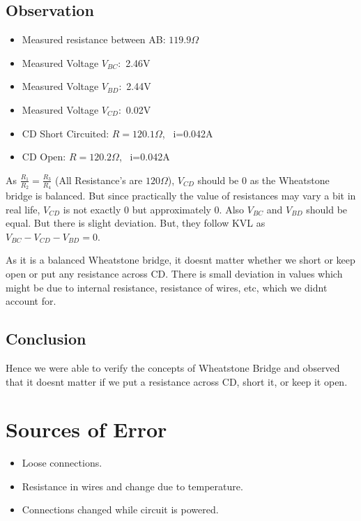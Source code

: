 \documentclass{article}
\begin{document}
\subsection{Observation}
\begin{itemize}
    \item Measured resistance between AB: $119.9 \Omega$
    \item Measured Voltage $V_{BC}:$ 2.46V
    \item Measured Voltage $V_{BD}:$ 2.44V
    \item Measured Voltage $V_{CD}:$ 0.02V
    \item CD Short Circuited: $R=120.1 \Omega$, \  i=0.042A
    \item CD Open: $R=120.2 \Omega$, \ i=0.042A
\end{itemize}


As $\frac{R_1}{R_2}=\frac{R_3}{R_4}$ (All Resistance's are $120 \Omega$), $V_{CD}$ should be 0 as the Wheatstone bridge is balanced. But since practically the value of resistances may vary a bit in real life, $V_{CD}$ is not exactly 0 but approximately 0. Also $V_{BC}$ and $V_{BD}$ should be equal. But there is slight deviation. But, they follow KVL as $V_{BC}-V_{CD}-V_{BD}=0$.

As it is a balanced Wheatstone bridge, it doesnt matter whether we short or keep open or put any resistance across CD. There is small deviation in values which might be due to internal resistance, resistance of wires, etc, which we didnt account for.

\subsection{Conclusion}
Hence we were able to verify the concepts of Wheatstone Bridge and observed that it doesnt matter if we put a resistance across CD, short it, or keep it open.

\newpage

\section{Sources of Error}
\begin{itemize}
    \item Loose connections.
    \item Resistance in wires and change due to temperature.
    \item Connections changed while circuit is powered.
\end{itemize}
\end{document}
